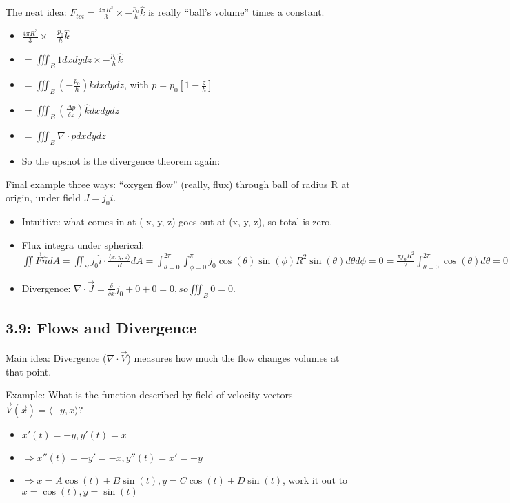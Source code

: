 \documentclass[11pt, oneside]{article}   	%
\begin{document}
The neat idea: $F_{tot} = \frac{4\pi R^3}{3} \times -\frac{p_0}{h}\hat{k}$ is really ``ball's volume'' times a constant.
\begin{itemize}
\item $\frac{4\pi R^3}{3} \times  -\frac{p_0}{h}\hat{k}$
\item $= \iiint_B 1 dx dy dz  \times  -\frac{p_0}{h}\hat{k}$

\item $= \iiint_B( -\frac{p_0}{h})\hat{k} dx dy dz$, with $p = p_0[1-\frac{z}{h}]$
\item $=  \iiint_B(\frac{\Delta p}{\delta z}) \hat{k} dx dy dz$
\item $=  \iiint_B \nabla \cdot p dx dy dz$
\item So the upshot is the divergence theorem again:
\end{itemize}

Final example three ways: ``oxygen flow'' (really, flux) through ball of radius R at origin, under field $J = j_0\hat{i}$.
\begin{itemize}
\item Intuitive: what comes in at (-x, y, z)  goes out at (x, y, z), so total is zero.
\item Flux integra under spherical: $\iint \vec{F} \hat{n} dA = \iint_S j_0\hat{i} \cdot \frac{\langle x,y,z \rangle }{R} dA = \int_{\theta = 0}^{2\pi}\int_{\phi = 0}^{\pi} j_0 \cos(\theta)\sin(\phi) R^2 \sin(\theta) d\theta d\phi = 0 = \frac{\pi j_0 R^2}{2} \int_{\theta = 0}^{2\pi} \cos(\theta) d\theta = 0$
\item Divergence: $\nabla \cdot \vec{J} = \frac{\delta}{\delta x} j_0 + 0 + 0 = 0, so \iiint_B 0 = 0$.
\end{itemize}

\subsection{3.9: Flows and Divergence}

Main idea: Divergence ($\nabla \cdot \vec{V}$) measures how much the flow changes volumes at that point.

Example: What is the function described by field of velocity vectors $\vec{V}(\vec{x}) = \langle -y, x \rangle$?
\begin{itemize}
\item $x'(t) = -y, y'(t) = x$
\item $\Rightarrow x''(t) = -y' = -x, y''(t) = x' = -y$
\item $\Rightarrow x = A\cos(t) + B\sin(t), y = C\cos(t) + D\sin(t)$, work it out to $x = \cos(t), y = \sin(t)$
\end{itemize}
\end{document}

